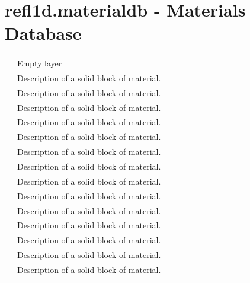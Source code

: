 \documentclass[letterpaper,10pt,english]{sphinxmanual}
\begin{document}
\section{refl1d.materialdb - Materials Database}
\label{api/materialdb:refl1d-materialdb-materials-database}\label{api/materialdb::doc}
\begin{tabulary}{\linewidth}{LL}
\hline

 & 
Empty layer
\\

 & 
Description of a solid block of material.
\\

 & 
Description of a solid block of material.
\\

 & 
Description of a solid block of material.
\\

 & 
Description of a solid block of material.
\\

 & 
Description of a solid block of material.
\\

 & 
Description of a solid block of material.
\\

 & 
Description of a solid block of material.
\\

 & 
Description of a solid block of material.
\\

 & 
Description of a solid block of material.
\\

 & 
Description of a solid block of material.
\\

 & 
Description of a solid block of material.
\\

 & 
Description of a solid block of material.
\\

 & 
Description of a solid block of material.
\\

 & 
Description of a solid block of material.
\\
\hline
\end{tabulary}
\end{document}

